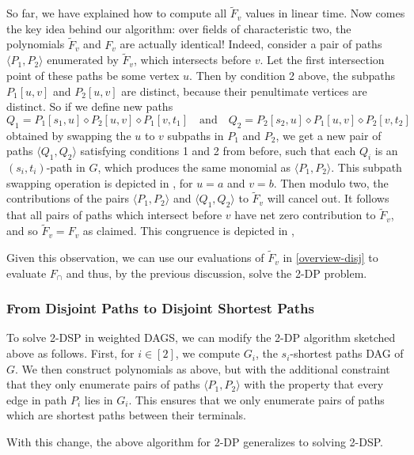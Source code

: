 \documentclass[11pt]{article}
\newcommand{\pair}[1]{\langle #1\rangle}
\newcommand{\dia}{\diamond}
\theoremstyle{definition}
\begin{document}
So far, we have explained how to compute all $\tilde{F}_v$ values in linear time.
Now comes the key idea behind our algorithm: over fields of characteristic two,  the polynomials $\tilde{F}_v$ and $F_v$ are actually identical! 
Indeed, consider a pair of paths $\pair{P_1, P_2}$ enumerated by $\tilde{F}_v$, which intersects before $v$.
Let the first intersection point of these paths be some vertex $u$.
Then by condition 2 above, the subpaths $P_1[u,v]$ and $P_2[u,v]$ are distinct, because their penultimate vertices are distinct.
So if we define new paths 
    \[Q_1 = P_1[s_1,u]\dia P_2[u,v]\dia P_1[v,t_1]
    \quad\text{and}\quad 
    Q_2 = P_2[s_2,u]\dia P_1[u,v]\dia P_2[v,t_2]\]
obtained by swapping the $u$ to $v$ subpaths in $P_1$ and $P_2$, we get a new pair of paths $\pair{Q_1,Q_2}$ satisfying conditions 1 and 2 from before, such that each $Q_i$ is an $(s_i,t_i)$-path in $G$, which produces the same monomial as $\pair{P_1,P_2}$.
This subpath swapping operation is depicted in , for $u=a$ and $v=b$.
Then modulo two, the contributions of the pairs $\pair{P_1,P_2}$ and $\pair{Q_1,Q_2}$ to $\tilde{F}_v$ will cancel out.
It follows that all pairs of paths which intersect before $v$ have net zero contribution to  $\tilde{F}_v$, and so $\tilde{F}_v = F_v$ as claimed.
This congruence is depicted in ,



Given this observation, we can use our evaluations of $\tilde{F}_v$ in \cref{overview-disj} to evaluate $F_{\cap}$ and thus, by the previous discussion, solve the \textsf{2-DP} problem.

\subsubsection*{From Disjoint Paths to Disjoint Shortest Paths}

To solve \textsf{2-DSP} in weighted DAGS, we can modify the \textsf{2-DP} algorithm sketched above as follows.
First, for $i\in [2]$, we compute $G_i$, the $s_i$-shortest paths DAG of $G$.
We then construct polynomials as above, but with the additional constraint that they only enumerate pairs of paths $\langle P_1,P_2\rangle$ with the property that every edge in path $P_i$ lies in $G_i$.
This ensures that we only enumerate pairs of paths which are shortest paths between their terminals.

With this change, the above algorithm for \textsf{2-DP} generalizes to solving \textsf{2-DSP}. 
\end{document}
